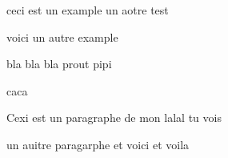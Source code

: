 \beguindocument
ceci est un example
un aotre test

voici un autre example

bla bla bla
prout
pipi


caca

Cexi est un paragraphe de mon lalal tu vois

un auitre paragarphe et voici et voila
